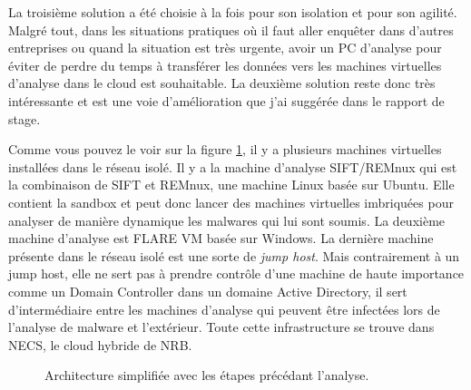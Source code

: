 La troisième solution a été choisie à la fois pour son isolation et pour son agilité. Malgré tout, dans les situations pratiques où il faut aller enquêter dans d'autres entreprises ou quand la situation est très urgente, avoir un PC d'analyse pour éviter de perdre du temps à transférer les données vers les machines virtuelles d'analyse dans le cloud est souhaitable. La deuxième solution reste donc très intéressante et est une voie d'amélioration que j'ai suggérée dans le rapport de stage.

Comme vous pouvez le voir sur la figure \ref{fig:architecture-sandboxing-simplified}, il y a plusieurs machines virtuelles installées dans le réseau isolé. Il y a la machine d'analyse SIFT/REMnux qui est la combinaison de SIFT et REMnux, une machine Linux basée sur Ubuntu. Elle contient la sandbox et peut donc lancer des machines virtuelles imbriquées pour analyser de manière dynamique les malwares qui lui sont soumis. La deuxième machine d'analyse est FLARE VM basée sur Windows. La dernière machine présente dans le réseau isolé est une sorte de \textit{jump host}. Mais contrairement à un jump host, elle ne sert pas à prendre contrôle d'une machine de haute importance comme un Domain Controller dans un domaine Active Directory, il sert d'intermédiaire entre les machines d'analyse qui peuvent être infectées lors de l'analyse de malware et l'extérieur. Toute cette infrastructure se trouve dans NECS, le cloud hybride de NRB.

\begin{figure}
    \centering
    \caption{Architecture simplifiée avec les étapes précédant l'analyse.}
    \label{fig:architecture-sandboxing-simplified}
\end{figure}

